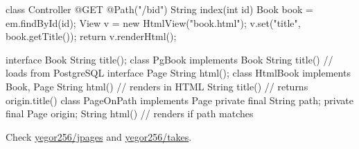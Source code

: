 \documentclass{article}
\begin{document}
\begin{pptWide}{2}
{\small\begin{ffcode}
class Controller {
  @GET
  @Path("/b{id}")
  String index(int id) {
    Book book = em.findById(id);
    View v = new HtmlView("book.html");
    v.set("title", book.getTitle());
    return v.renderHtml();
  }
}
\end{ffcode}
}
\par\columnbreak\par
{\scriptsize\begin{ffcode}
interface Book
  String title();
class PgBook implements Book
  String title() // loads from PostgreSQL
interface Page
  String html();
class HtmlBook implements Book, Page
  String html() // renders in HTML
  String title() // returns origin.title()
class PageOnPath implements Page
  private final String path;
  private final Page origin;
  String html() // renders if path matches
\end{ffcode}
}
\end{pptWide}
\par
Check \href{https://github.com/yegor256/jpages}{yegor256/jpages} and \href{https://github.com/yegor256/takes}{yegor256/takes}.
\plush{}

\end{document}
